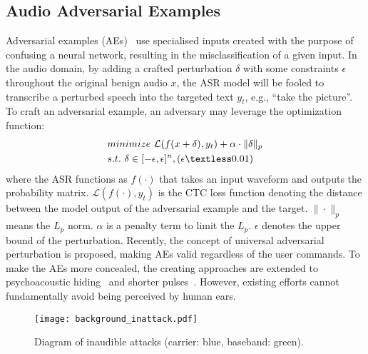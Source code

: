 \subsection{Audio Adversarial Examples}
Adversarial examples (AEs)~\cite{carlini2018audio,schonherr2018adversarial,yuan2018commandersong,chen2020metamorph} use specialised inputs created with the purpose of confusing a neural network, resulting in the misclassification of a given input. In the audio domain, by adding a crafted perturbation $\delta$ with some constraints $\epsilon$ throughout the original benign audio $x$, the ASR model will be fooled to transcribe a perturbed speech into the targeted text $y_t$, e.g., ``take the picture''. To craft an adversarial example, an adversary may leverage the optimization function:
\begin{equation}
\begin{aligned}
    & {minimize}~ \mathcal{L}(f(x+\delta), y_t) + \alpha\cdot\Vert{\delta}\Vert_{p}\\
    & {s.t.}~ \delta \in [-\epsilon, \epsilon]^n, (\epsilon\textless 0.01)
\end{aligned}
\label{equ:audible_ae_formula}
\end{equation}
where the ASR functions as $f(\cdot)$ that takes an input waveform and outputs the probability matrix. $\mathcal{L}(f(\cdot),y_t)$ is the CTC loss function denoting the distance between the model output of the adversarial example and the target. $\|\cdot\|_{p}$ means the $L_p$ norm. $\alpha$ is a penalty term to limit the $L_p$. $\epsilon$ denotes the upper bound of the perturbation. 
Recently, the concept of universal adversarial perturbation is proposed, making AEs valid regardless of the user commands.
To make the AEs more concealed, the creating approaches are extended to psychoacoustic hiding~\cite{schonherr2018adversarial,qin2019imperceptible} and shorter pulses~\cite{li2020advpulse}. However, existing efforts cannot fundamentally avoid being perceived by human ears.

\begin{figure}[t]
	\centering
	\texttt{[image: background\_inattack.pdf]}
	\caption{\label{fig:dolphinattack_pipeline}Diagram of inaudible attacks (carrier: blue, baseband: green).}
        \addvspace{-15pt}
\end{figure}



